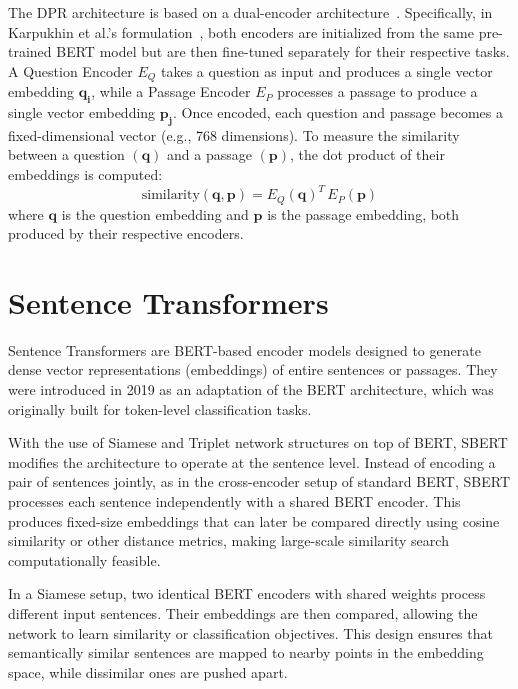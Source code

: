 The DPR architecture is based on a dual-encoder architecture~\cite{dualencoderarchitecture}. Specifically, in Karpukhin et al.'s formulation~\cite{densepassageretrievalopendomainkarpukhin2020}, both encoders are initialized from the same pre-trained \gls{BERT} model but are then fine-tuned separately for their respective tasks. A Question Encoder \(E_Q\) takes a question as input and produces a single vector embedding \(\mathbf{q_i}\), while a Passage Encoder \(E_P\) processes a passage to produce a single vector embedding \(\mathbf{p_j}\). Once encoded, each question and passage becomes a fixed-dimensional vector (e.g., 768 dimensions). To measure the similarity between a question \((\mathbf{q})\) and a passage \((\mathbf{p})\), the dot product of their embeddings is computed:
\begin{equation}
    \label{eq:dot_sim}
    \text{similarity}(\mathbf{q}, \mathbf{p}) = E_Q(\mathbf{q})^T \, E_P(\mathbf{p})
\end{equation}
where $\mathbf{q}$ is the question embedding and $\mathbf{p}$ is the passage embedding, both produced by their respective encoders.

\section{Sentence Transformers}
\label{sec:Sentence-Transformers}
Sentence Transformers are \gls{BERT}-based encoder models designed to generate dense vector representations (embeddings) of entire sentences or passages. 
They were introduced in 2019 \cite{reimers2019sentencebertsentenceembeddingsusing} as an adaptation of the \gls{BERT} architecture, which was originally built for token-level classification tasks.

With the use of Siamese and Triplet network structures on top of \gls{BERT}, SBERT modifies the architecture to operate at the sentence level. Instead of encoding a pair of sentences jointly, as in the cross-encoder setup of standard \gls{BERT}, SBERT processes each sentence independently with a shared \gls{BERT} encoder. This produces fixed-size embeddings that can later be compared directly using cosine similarity or other distance metrics, making large-scale similarity search computationally feasible.

In a Siamese setup, two identical \gls{BERT} encoders with shared weights process different input sentences. Their embeddings are then compared, allowing the network to learn similarity or classification objectives. This design ensures that semantically similar sentences are mapped to nearby points in the embedding space, while dissimilar ones are pushed apart.

